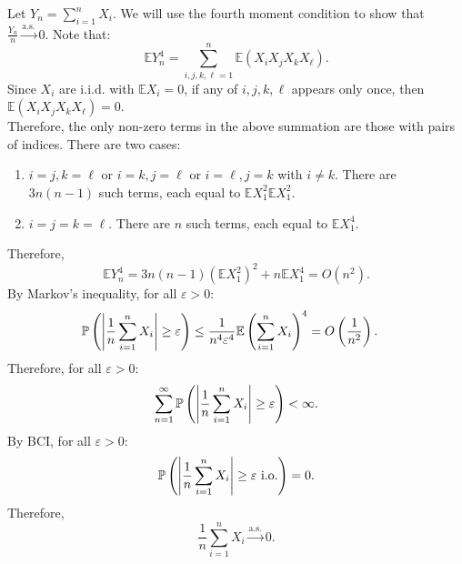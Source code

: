 \documentclass{huhtakm-template-book-v2}
\newcommand{\prob}{\mathbb{P}}
\newcommand{\expect}{\mathbb{E}}
\begin{document}
    \begin{proofing}
        Let $Y_{n} = \sum_{i = 1}^{n}X_{i}$. We will use the fourth moment condition to show that $\frac{Y_{n}}{n} \xrightarrow{\text{a.s.}} 0$. Note that:
        \begin{equation*}
            \expect{Y_{n}^{4}} = \sum_{i,j,k,\ell = 1}^{n}\expect(X_{i}X_{j}X_{k}X_{\ell}).
        \end{equation*}
        Since $X_{i}$ are i.i.d. with $\expect{X_{i}} = 0$, if any of $i,j,k,\ell$ appears only once, then $\expect(X_{i}X_{j}X_{k}X_{\ell}) = 0$.\\
        Therefore, the only non-zero terms in the above summation are those with pairs of indices. There are two cases:
        \begin{enumerate}
            \item $i = j,k = \ell$ or $i = k,j = \ell$ or $i = \ell,j = k$ with $i \neq k$. There are $3n(n-1)$ such terms, each equal to $\expect{X_{1}^{2}}\expect{X_{1}^{2}}$.
            \item $i = j = k = \ell$. There are $n$ such terms, each equal to $\expect{X_{1}^{4}}$.
        \end{enumerate}
        Therefore,
        \begin{equation*}
            \expect{Y_{n}^{4}} = 3n(n-1)(\expect{X_{1}^{2}})^{2}+n\expect{X_{1}^{4}} = O(n^{2}).
        \end{equation*}
        By Markov's inequality, for all $\varepsilon > 0$:
        \begin{align*}
            \prob\left(\abs{\frac{1}{n}\sum_{i = 1}^{n}X_{i}} \geq \varepsilon\right) &\leq \frac{1}{n^{4}\varepsilon^{4}}\expect\left(\sum_{i = 1}^{n}X_{i}\right)^{4} = O\left(\frac{1}{n^{2}}\right).
        \end{align*}
        Therefore, for all $\varepsilon > 0$:
        \begin{equation*}
            \sum_{n = 1}^{\infty}\prob\left(\abs{\frac{1}{n}\sum_{i = 1}^{n}X_{i}} \geq \varepsilon\right) < \infty.
        \end{equation*}
        By BCI, for all $\varepsilon > 0$:
        \begin{equation*}
            \prob\left(\abs{\frac{1}{n}\sum_{i = 1}^{n}X_{i}} \geq \varepsilon\text{ i.o.}\right) = 0.
        \end{equation*}
        Therefore, 
        \begin{equation*}
            \frac{1}{n}\sum_{i = 1}^{n}X_{i} \xrightarrow{\text{a.s.}} 0.
        \end{equation*}
    \end{proofing}
    \newpage
\end{document}
